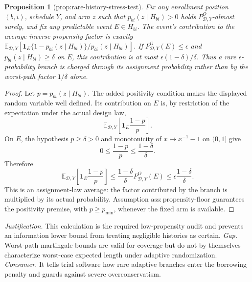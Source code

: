 \documentclass{article}
\newtheorem{proposition}{Proposition}
\begin{document}
\begin{proposition}[prop:rare-history-stress-test]\label{prop:rare-history-stress-test}
Fix any enrollment position \((b,i)\), schedule \(Y\), and arm \(z\) such that \(p_{bi}(z\mid H_{bi})>0\) holds \(P^O_{\mathcal D,Y}\)-almost surely, and fix any predictable event \(E\in H_{bi}\).  The event's contribution to the average inverse-propensity factor is exactly 
\(\mathbb E_{\mathcal D,Y}[\mathbf 1_E\{1-p_{bi}(z\mid H_{bi})\}/p_{bi}(z\mid H_{bi})]\).  If \(P^O_{\mathcal D,Y}(E)\le\epsilon\) and \(p_{bi}(z\mid H_{bi})\ge\delta\) on \(E\), this contribution is at most \(\epsilon(1-\delta)/\delta\).  Thus a rare \(\epsilon\)-probability branch is charged through its assignment probability rather than by the worst-path factor \(1/\delta\) alone.
\end{proposition}
\begin{proof}
Let \(p=p_{bi}(z\mid H_{bi})\).  The added positivity condition makes the displayed random variable well defined.  Its contribution on \(E\) is, by restriction of the expectation under the actual design law,
\[
\mathbb E_{\mathcal D,Y}\left[\mathbf 1_E\frac{1-p}{p}\right].
\]
On \(E\), the hypothesis \(p\ge\delta>0\) and monotonicity of \(x\mapsto x^{-1}-1\) on \((0,1]\) give
\[
0\le\frac{1-p}{p}\le\frac{1-\delta}{\delta}.
\]
Therefore
\[
\mathbb E_{\mathcal D,Y}\left[\mathbf 1_E\frac{1-p}{p}\right]
\le \frac{1-\delta}{\delta}P^O_{\mathcal D,Y}(E)
\le\epsilon\frac{1-\delta}{\delta}.
\]
This is an assignment-law average: the factor contributed by the branch is multiplied by its actual probability.  Assumption \(\mathrm{ass:propensity\text{-}floor}\) guarantees the positivity premise, with \(p\ge p_{\min}\), whenever the fixed arm is available.
\end{proof}
\par\smallskip\noindent \textit{Justification.} This calculation is the required low-propensity audit and prevents an information lower bound from treating negligible histories as certain. \textit{Gap.} Worst-path martingale bounds are valid for coverage but do not by themselves characterize worst-case expected length under adaptive randomization. \textit{Consumer.} It tells trial software how rare adaptive branches enter the borrowing penalty and guards against severe overconservatism.
\end{document}
